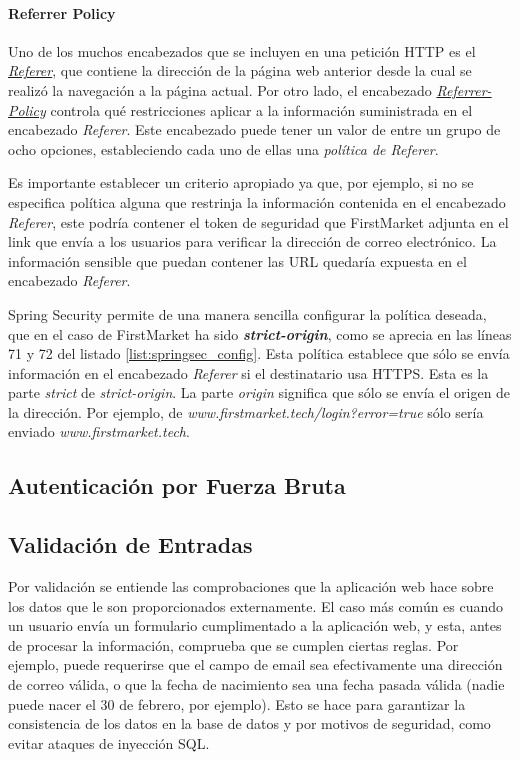 \documentclass[a4paper]{article}
\begin{document}
	\paragraph{Referrer  Policy}
	Uno de los muchos encabezados que se incluyen en una petición HTTP es el \href{https://developer.mozilla.org/en-US/docs/Web/HTTP/Headers/Referer}{\emph{Referer}}, que contiene la dirección de la página web anterior desde la cual se realizó la navegación a la página actual. Por otro lado, el encabezado \href{https://developer.mozilla.org/en-US/docs/Web/HTTP/Headers/Referrer-Policy}{\emph{Referrer-Policy}} controla qué restricciones aplicar a la información suministrada en el encabezado \emph{Referer}. Este encabezado puede tener un valor de entre un grupo de ocho opciones, estableciendo cada uno de ellas una \emph{política de Referer}.
	
	Es importante establecer un criterio apropiado ya que, por ejemplo, si no se especifica política alguna que restrinja la información contenida en el encabezado \emph{Referer}, este podría contener el token de seguridad que FirstMarket adjunta en el link que envía a los usuarios para verificar la dirección de correo electrónico. La información sensible que puedan contener las URL quedaría expuesta en el encabezado \emph{Referer}.
	
	Spring Security permite de una manera sencilla configurar la política deseada, que en el caso de FirstMarket ha sido \textbf{\emph{strict-origin}}, como se aprecia en las líneas 71 y 72 del listado \ref{list:springsec_config}. Esta política establece que sólo se envía información en el encabezado \emph{Referer} si el destinatario usa HTTPS. Esta es la parte \emph{strict} de \emph{strict-origin}. La parte \emph{origin} significa que sólo se envía el origen de la dirección. Por ejemplo, de \emph{www.firstmarket.tech/login?error=true} sólo sería enviado \emph{www.firstmarket.tech}.
	
	\subsection{Autenticación por Fuerza Bruta}
	\subsection{Validación de Entradas}
	Por validación se entiende las comprobaciones que la aplicación web hace sobre los datos que le son proporcionados externamente. El caso más común es cuando un usuario envía un formulario cumplimentado a la aplicación web, y esta, antes de procesar la información, comprueba que se cumplen ciertas reglas. Por ejemplo, puede requerirse que el campo de email sea efectivamente una dirección de correo válida, o que la fecha de nacimiento sea una fecha pasada válida (nadie puede nacer el 30 de febrero, por ejemplo). Esto se hace para garantizar la consistencia de los datos en la base de datos y por motivos de seguridad, como evitar ataques de inyección SQL.
	
\end{document}
